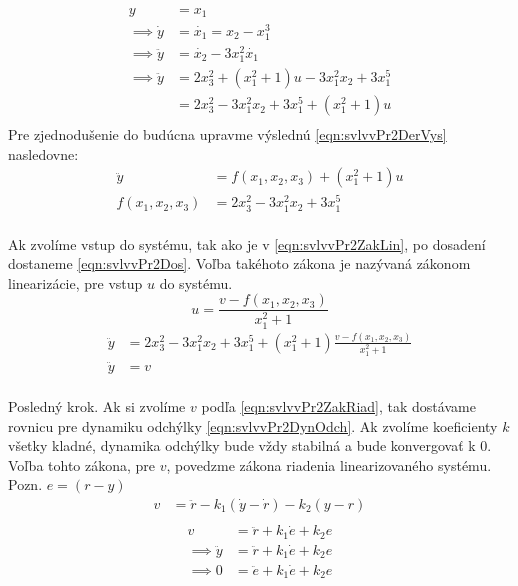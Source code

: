 \documentclass[../main.tex]{subfiles}
\begin{document}
 	\begin{equation}
	\begin{aligned}
	y &= x_1 \\ 
	\implies \dot{y}  &= \dot{x_1} =  x_2 - x_1^3 \\
	\implies \ddot{y} &= \dot{x_2} - 3x_1^2\dot{x_1} \\
	\implies \ddot{y} &= 2x_3^2 + (x_1^2 + 1)u - 3x_1^2x_2 + 3x_1^5 \\
	&= 2x_3^2 - 3x_1^2x_2 + 3x_1^5 + (x_1^2 + 1)u\\
	\end{aligned}
	\label{eqn:svlvvPr2DerVys}
	\end{equation}
	Pre zjednodušenie do budúcna upravme výslednú \cref{eqn:svlvvPr2DerVys} nasledovne:
	 \begin{equation}
	\begin{aligned}
	\ddot{y} &= f(x_1,x_2,x_3) + (x_1^2 + 1)u \\
	f(x_1,x_2,x_3) &= 2x_3^2 - 3x_1^2x_2 + 3x_1^5\\
	\end{aligned}
	\label{eqn:svlvvPr2DerUp}
	\end{equation}
	
	Ak zvolíme vstup do systému, tak ako je v \cref{eqn:svlvvPr2ZakLin}, po dosadení dostaneme \cref{eqn:svlvvPr2Dos}. Voľba takéhoto zákona je nazývaná zákonom linearizácie, pre vstup $u$ do systému.
	\begin{equation}
	u = \frac{v - f(x_1,x_2,x_3)}{x_1^2 + 1}
	\label{eqn:svlvvPr2ZakLin}
	\end{equation}
	\begin{equation}
	\begin{aligned}
	\ddot{y} &= 2x_3^2 - 3x_1^2x_2 + 3x_1^5 + (x_1^2 + 1)\frac{v - f(x_1,x_2,x_3)}{x_1^2 + 1} \\
	\ddot{y} &=v  \\ 
	\end{aligned}
	\label{eqn:svlvvPr2Dos}
	\end{equation}
	
	Posledný krok. Ak si zvolíme $v$ podľa \cref{eqn:svlvvPr2ZakRiad}, tak dostávame rovnicu pre dynamiku odchýlky \cref{eqn:svlvvPr2DynOdch}. Ak zvolíme koeficienty $k$ všetky kladné, dynamika odchýlky bude vždy stabilná a bude konvergovať k 0. Voľba tohto zákona, pre $v$, povedzme zákona riadenia linearizovaného systému. Pozn. $e = (r - y)$
	\begin{equation}
	\begin{aligned}
	v &= \ddot{r} - k_1 (\dot{y} - \dot{r}) - k_2(y-r)\\
	\end{aligned}
	\label{eqn:svlvvPr2ZakRiad}
	\end{equation}
	\begin{equation}
	\begin{aligned}
	v &= \ddot{r}  +k_1 \dot{e} + k_2 e \\
	\implies \ddot{y} &= \ddot{r}  +k_1 \dot{e} + k_2 e \\
	\implies 0 &= \ddot{e}  + k_1 \dot{e} + k_2 e \\	 
	\end{aligned}
	\label{eqn:svlvvPr2DynOdch}
	\end{equation}
	
\end{document}
